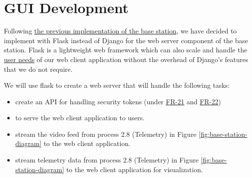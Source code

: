 %
%
%
%

\section{GUI Development}

Following \hyperref[sec:basestation-previous-implementation]{the previous implementation of the base station}, we have decided to implement with Flask instead of Django for the web server component of the base station.
Flask is a lightweight web framework\autocite{FLASK} which can also scale and handle the \hyperref[sec:basestation-user-needs]{user needs} of our web client application without the overhead of Django's features that we do not require.

We will use flask to create a web server that will handle the following tasks:

\begin{itemize}
    \item create an API for handling security tokens (under \hyperref[itm:fr-webclient-token]{FR-21} and \hyperref[itm:fr-webclient-admin]{FR-22}) 
    \item to serve the web client application to users.
    \item stream the video feed from process 2.8 (Telemetry) in Figure \ref{fig:base-station-diagram} to the web client application.
    \item stream telemetry data from process 2.8 (Telemetry) in Figure \ref{fig:base-station-diagram} to the web client application for visualization.
\end{itemize}

